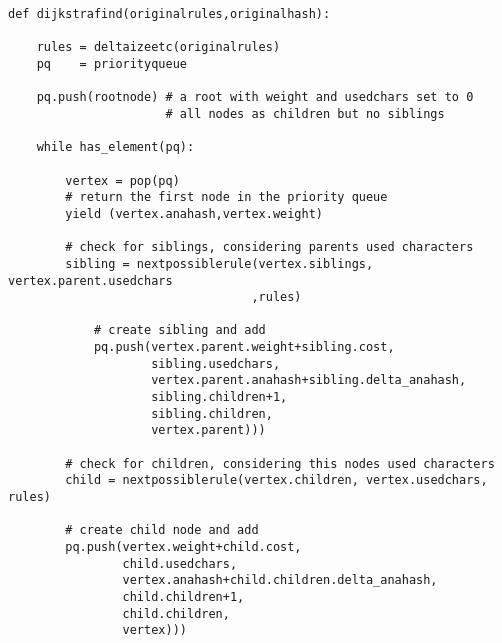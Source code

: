 \documentclass[10pt,a5paper,twoside]{article}
\begin{document}
\begin{small}
\begin{verbatim}
def dijkstrafind(originalrules,originalhash):

    rules = deltaizeetc(originalrules)
    pq    = priorityqueue

    pq.push(rootnode) # a root with weight and usedchars set to 0 
                      # all nodes as children but no siblings

    while has_element(pq):

        vertex = pop(pq)
        # return the first node in the priority queue
        yield (vertex.anahash,vertex.weight)

        # check for siblings, considering parents used characters
        sibling = nextpossiblerule(vertex.siblings, vertex.parent.usedchars
                                  ,rules)
        
            # create sibling and add
            pq.push(vertex.parent.weight+sibling.cost,
                    sibling.usedchars,
                    vertex.parent.anahash+sibling.delta_anahash,
                    sibling.children+1,
                    sibling.children,
                    vertex.parent)))
 
        # check for children, considering this nodes used characters
        child = nextpossiblerule(vertex.children, vertex.usedchars, rules)
                   
        # create child node and add
        pq.push(vertex.weight+child.cost,
                child.usedchars,
                vertex.anahash+child.children.delta_anahash,
                child.children+1,
                child.children,
                vertex)))
        
\end{verbatim}\end{small}






\end{document}

